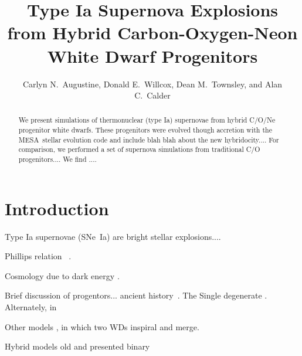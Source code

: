 \documentclass[iop,apj]{emulateapj}
\newcommand{\SNeIa}{SNe~Ia}
\newcommand{\code}[1]{\textsc{#1}}
\newcommand{\MESA}{\code{MESA}}
\begin{document}
\title{Type Ia Supernova Explosions from Hybrid Carbon-Oxygen-Neon White Dwarf Progenitors}

\author{
Carlyn N.\ Augustine,
Donald E.\ Willcox,
Dean M.\ Townsley,
and Alan C.\ Calder
}


\begin{abstract}
We present simulations of thermonuclear (type Ia) supernovae
from hybrid C/O/Ne progenitor white dwarfs. These progenitors 
were evolved though accretion with the \MESA\ stellar evolution code 
and include blah blah about the new hybridocity....
For comparison, we performed a set of supernova simulations from
traditional C/O progenitors....
We find ....
\end{abstract}


\section{Introduction}
\label{sec:intro}
Type Ia supernovae (\SNeIa) are bright stellar explosions....

Phillips relation
~\citep{phillips:absolute}. 

Cosmology
due to dark energy \citep{riess.filippenko.ea:observational,
perlmutter.aldering.ea:measurements,leibundgut2001}. 

Brief discussion of progentors...
ancient history~\citep{hoylefowler60,arnett.truran.ea:nucleosynthesis}. The
Single degenerate 
\citep{hoylefowler60,trucam71,whelaniben73,Nomo84}. Alternately, in

Other models
\citep{webbink84,ibentutukov84}, in which two WDs inspiral and merge.

Hybrid models 
old 
\citep{denissenkovetal2015}
\citet{Wangetal2014} and \citet{Mengetal2014} presented binary
\end{document}
